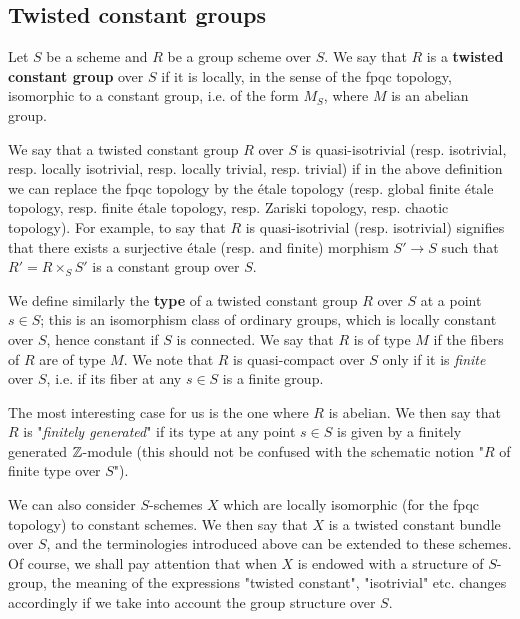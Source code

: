 \subsection{Twisted constant groups}\label{scheme enlarged fundamental group subsection}
Let $S$ be a scheme and $R$ be a group scheme over $S$. We say that $R$ is a \textbf{twisted constant group} over $S$ if it is locally, in the sense of the fpqc topology, isomorphic to a constant group, i.e. of the form $M_S$, where $M$ is an abelian group.\par
We say that a twisted constant group $R$ over $S$ is quasi-isotrivial (resp. isotrivial, resp. locally isotrivial, resp. locally trivial, resp. trivial) if in the above definition we can replace the fpqc topology by the \'etale topology (resp. global finite \'etale topology, resp. finite \'etale topology, resp. Zariski topology, resp. chaotic topology). For example, to say that $R$ is quasi-isotrivial (resp. isotrivial) signifies that there exists a surjective \'etale (resp. and finite) morphism $S'\to S$ such that $R'=R\times_SS'$ is a constant group over $S$.\par
We define similarly the \textbf{type} of a twisted constant group $R$ over $S$ at a point $s\in S$; this is an isomorphism class of ordinary groups, which is locally constant over $S$, hence constant if $S$ is connected. We say that $R$ is of type $M$ if the fibers of $R$ are of type $M$. We note that $R$ is quasi-compact over $S$ only if it is \textit{finite} over $S$, i.e. if its fiber at any $s\in S$ is a finite group.\par
The most interesting case for us is the one where $R$ is abelian. We then say that $R$ is "\textit{finitely generated}" if its type at any point $s\in S$ is given by a finitely generated $\mathbb{Z}$-module (this should not be confused with the schematic notion "$R$ of finite type over $S$").

\begin{remark}
We can also consider $S$-schemes $X$ which are locally isomorphic (for the fpqc topology) to constant schemes. We then say that $X$ is a twisted constant bundle over $S$, and the terminologies introduced above can be extended to these schemes. Of course, we shall pay attention that when $X$ is endowed with a structure of $S$-group, the meaning of the expressions "twisted constant", "isotrivial" etc. changes accordingly if we take into account the group structure over $S$.
\end{remark}

